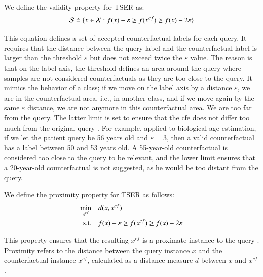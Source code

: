 \begin{definition}
\label{def:validity}
We define the validity property for TSER as:
$$\mathcal{S} \doteq \{x \in \mathcal{X}:f(x) - \varepsilon \geq f(x^{c f}) \geq f(x) - 2\varepsilon\}$$
\end{definition}
This equation defines a set of accepted counterfactual labels for each query. It requires that the distance between the query label and the counterfactual label is larger than the threshold $\varepsilon$ but does not exceed twice the $\varepsilon$ value. The reason is that on the label axis, the threshold defines an area around the query where samples are not considered counterfactuals as they are too close to the query. It mimics the behavior of a class; if we move on the label axis by a distance $\varepsilon$, we are in the counterfactual area, i.e., in another class, and if we move again by the same $\varepsilon$ distance, we are not anymore in this counterfactual area. We are too far from the query. The latter limit is set to ensure that the  \gls{cfe} does not differ too much from the original query \cite{spooner_counterfactual_2021}.
For example, applied to biological age estimation, if we let the patient query be 56 years old and $\varepsilon = 3$, then a valid counterfactual has a label between 50 and 53 years old. A 55-year-old counterfactual is considered too close to the query to be relevant, and the lower limit ensures that a 20-year-old counterfactual is not suggested, as he would be too distant from the query.   

\begin{definition}
We define the proximity property for TSER as follows:
\begin{equation}
\begin{aligned}
\min_{x^{cf}} \quad & d(x, x^{c f})\\
\mathrm{s.t.} \quad & f(x) - \varepsilon \geq f(x^{c f}) \geq f(x) - 2\varepsilon\\
\end{aligned}
\end{equation}
\label{def:proximity}
\end{definition}
This property ensures that the resulting $x^{c f}$ is a proximate instance to the query \cite{mothilal_explaining_2020}. Proximity refers to the distance between the query instance $x$ and the counterfactual instance $x^{c f}$, calculated as a distance measure $d$ between $x$ and $x^{c f}$.


